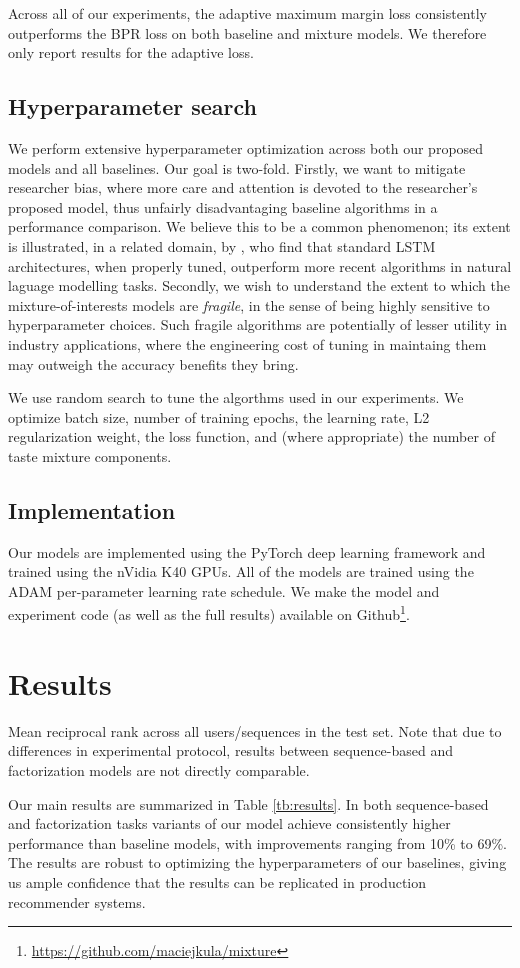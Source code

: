 \documentclass[sigchi]{acmart}
\begin{document}
Across all of our experiments, the adaptive maximum margin loss consistently outperforms the BPR loss on both baseline and mixture models. We therefore only report results for the adaptive loss.

\subsection{Hyperparameter search}

We perform extensive hyperparameter optimization across both our proposed models and all baselines. Our goal is two-fold. Firstly, we want to mitigate researcher bias, where more care and attention is devoted to the researcher's proposed model, thus unfairly disadvantaging baseline algorithms in a performance comparison. We believe this to be a common phenomenon; its extent is illustrated, in a related domain, by \cite{melis2017state}, who find that standard LSTM architectures, when properly tuned, outperform more recent algorithms in natural laguage modelling tasks. Secondly, we wish to understand the extent to which the mixture-of-interests models are \emph{fragile}, in the sense of being highly sensitive to hyperparameter choices. Such fragile algorithms are potentially of lesser utility in industry applications, where the engineering cost of tuning in maintaing them may outweigh the accuracy benefits they bring.

We use random search to tune the algorthms used in our experiments. We optimize batch size, number of training epochs, the learning rate, L2 regularization weight, the loss function, and (where appropriate) the number of taste mixture components.

\subsection{Implementation}
Our models are implemented using the PyTorch deep learning framework \citep{paszke2017pytorch} and trained using the nVidia K40 GPUs. All of the models are trained using the ADAM \citep{kingma2014adam} per-parameter learning rate schedule. We make the model and experiment code (as well as the full results) available on Github\footnote{\url{https://github.com/maciejkula/mixture}}.

\section{Results}
\begin{table}[htbp]
\caption{Mean reciprocal rank across all users/sequences in the test set. Note that due to differences in experimental protocol, results between sequence-based and factorization models are not directly comparable.}
\label{tb:results}

\end{table}
Our main results are summarized in Table \ref{tb:results}. In both sequence-based and factorization tasks variants of our model achieve consistently higher performance than baseline models, with improvements ranging from 10\% to 69\%. The results are robust to optimizing the hyperparameters of our baselines, giving us ample confidence that the results can be replicated in production recommender systems.
\end{document}
